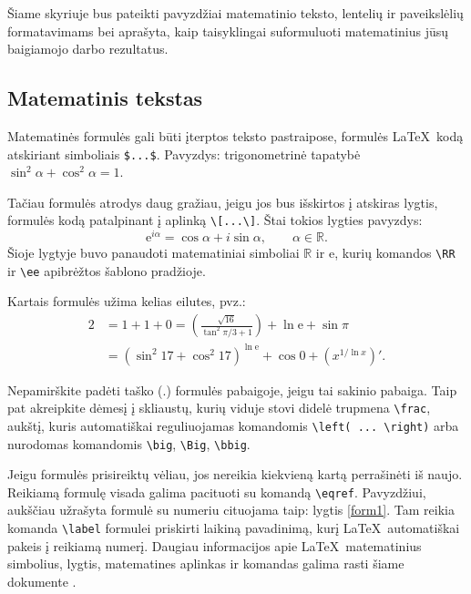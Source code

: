 \documentclass[]{VUMIFTemplateClass}
\newcommand{\ee}{{\mathrm e}}
\newcommand{\RR}{\mathbb{R}}
\begin{document}
Šiame skyriuje bus pateikti pavyzdžiai matematinio teksto, lentelių ir paveikslėlių formatavimams bei aprašyta, kaip taisyklingai suformuluoti matematinius jūsų baigiamojo darbo rezultatus.

\subsection{Matematinis tekstas}

Matematinės formulės gali būti įterptos teksto pastraipose, formulės \LaTeX~kodą atskiriant simboliais \texttt{\$...\$}. Pavyzdys: trigonometrinė tapatybė $\sin^2 \alpha + \cos^2 \alpha = 1$.

Tačiau formulės atrodys daug gražiau, jeigu jos bus išskirtos į atskiras lygtis, formulės kodą patalpinant į aplinką \texttt{\textbackslash[...\textbackslash]}. Štai tokios lygties pavyzdys:
\[
\ee^{i \alpha} = \cos{\alpha} + i \sin{\alpha}, \qquad \alpha \in \RR.
\]
Šioje lygtyje buvo panaudoti matematiniai simboliai $\RR$ ir $\ee$, kurių komandos \texttt{\textbackslash RR} ir \texttt{\textbackslash ee} apibrėžtos šablono pradžioje.

Kartais formulės užima kelias eilutes, pvz.:
\begin{equation}
\begin{split}
2&= 1+1+0=\left(\frac{\sqrt{16}}{\tan^2\pi/3+1}\right) +\ln\ee+\sin\pi\\
&= (\sin^2 17+\cos^2 17)^{\ln\ee}+\cos 0 +(x^{1/\ln x})'. 
\label{form1}
\end{split}
\end{equation}

Nepamirškite padėti taško ($.$) formulės pabaigoje, jeigu tai sakinio pabaiga. Taip pat akreipkite dėmesį į skliaustų, kurių viduje stovi didelė trupmena \texttt{\textbackslash frac}, aukštį, kuris automatiškai reguliuojamas komandomis \texttt{\textbackslash left( ... \textbackslash right)} arba nurodomas komandomis \texttt{\textbackslash big}, \texttt{\textbackslash Big}, \texttt{\textbackslash bbig}.

\bigskip

Jeigu formulės prisireiktų vėliau, jos nereikia kiekvieną kartą perrašinėti iš naujo. Reikiamą formulę visada galima pacituoti su komandą \texttt{\textbackslash eqref}. Pavyzdžiui, aukščiau užrašyta formulė su numeriu cituojama taip: lygtis \eqref{form1}. Tam reikia komanda \texttt{\textbackslash  label} formulei priskirti laikiną pavadinimą, kurį \LaTeX~automatiškai pakeis į reikiamą numerį. Daugiau informacijos apie \LaTeX~matematinius simbolius, lygtis, matematines aplinkas ir komandas galima rasti šiame dokumente \cite{amsdoc}.
\end{document}
